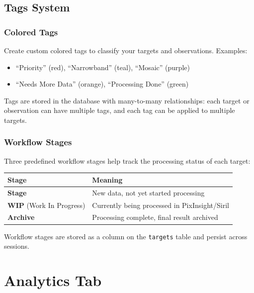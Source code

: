 \documentclass[11pt,a4paper]{article}
\begin{document}
\subsection{Tags System}

\subsubsection{Colored Tags}

Create custom colored tags to classify your targets and observations. Examples:
\begin{itemize}
    \item ``Priority'' (red), ``Narrowband'' (teal), ``Mosaic'' (purple)
    \item ``Needs More Data'' (orange), ``Processing Done'' (green)
\end{itemize}

Tags are stored in the database with many-to-many relationships: each target or observation can have multiple tags, and each tag can be applied to multiple targets.

\subsubsection{Workflow Stages}

Three predefined workflow stages help track the processing status of each target:

\begin{center}
\begin{tabular}{lp{9cm}}
\toprule
\textbf{Stage} & \textbf{Meaning} \\
\midrule
\textbf{Stage} & New data, not yet started processing \\
\textbf{WIP} (Work In Progress) & Currently being processed in PixInsight/Siril \\
\textbf{Archive} & Processing complete, final result archived \\
\bottomrule
\end{tabular}
\end{center}

Workflow stages are stored as a column on the \texttt{targets} table and persist across sessions.


\section{Analytics Tab}
\label{sec:analytics}
\end{document}
